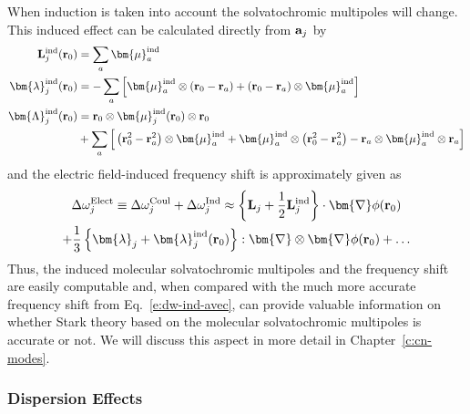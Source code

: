 \documentclass[b5paper,oneside,fleqn,11pt]{book}
\newcommand{\BM}[1]{\bm{#1}}
\begin{document}
\begin{refsection}
When induction is taken into account the solvatochromic multipoles
will change. This induced effect can be calculated directly from
${\bf a}_j$ by
%
\begin{subequations}
\begin{align}
{\bf L}_j^{\rm ind}({\bf r}_0)       &=   \sum_a {\BM \mu}_a^{\rm ind} \label{e:34e1} \\
{\BM \lambda}_j^{\rm ind}({\bf r}_0) &= - \sum_a \Big[ {\BM \mu}_a^{\rm ind} \otimes \left( {\bf r}_0 
                                       - {\bf r}_a \right) + \left( {\bf r}_0 
                                       - {\bf r}_a \right) \otimes {\BM \mu}_a^{\rm ind} \Big] \label{e:34e2} \\
{\BM \Lambda}_j^{\rm ind}({\bf r}_0) &=   {\bf r}_0 \otimes {\BM \mu}_j^{\rm ind}({\bf r}_0) \otimes {\bf r}_0 \nonumber \\ 
                                    &  + \sum_a \Big[ \left( {\bf r}_0^2 - {\bf r}_a^2 \right) \otimes {\BM \mu}_a^{\rm ind} 
                                       + {\BM \mu}_a^{\rm ind} \otimes \left( {\bf r}_0^2 - {\bf r}_a^2 \right) 
                                       - {\bf r}_a \otimes {\BM \mu}_a^{\rm ind} \otimes {\bf r}_a \Big] \label{e:34e3}
\end{align}
\end{subequations}
%
and the electric field\hyp{}induced frequency shift 
is approximately given as
%
\begin{multline} \label{e:dmtp-solmmm-ind}
 \Delta\omega_j^{\rm Elect} \equiv  \Delta\omega_j^{\rm Coul} +  \Delta\omega_j^{\rm Ind} \approx  
                       \left\{ {\bf L}_j + \frac{1}{2} {\bf L}_j^{\rm ind} \right\} 
                       \cdot {\BM \nabla} \phi({\bf r}_0)   \\ + 
      \frac{1}{3} \left\{ {\BM \lambda}_j + {\BM \lambda}_j^{\rm ind}({\bf r}_0) \right\} 
                           : {\BM \nabla} \otimes {\BM \nabla} \phi({\bf r}_0)   +   \ldots
\end{multline}
%
Thus, the induced molecular solvatochromic multipoles and the frequency shift
are easily computable and, when compared with the much more accurate
frequency shift from Eq.~\eqref{e:dw-ind-avec}, can provide valuable 
information on whether Stark theory based on the molecular
solvatochromic multipoles is accurate or not. We will discuss 
this aspect in more detail in Chapter~\ref{c:cn-modes}.

\subsubsection{Dispersion Effects\label{s:disp}}


\end{refsection}
\end{document}
